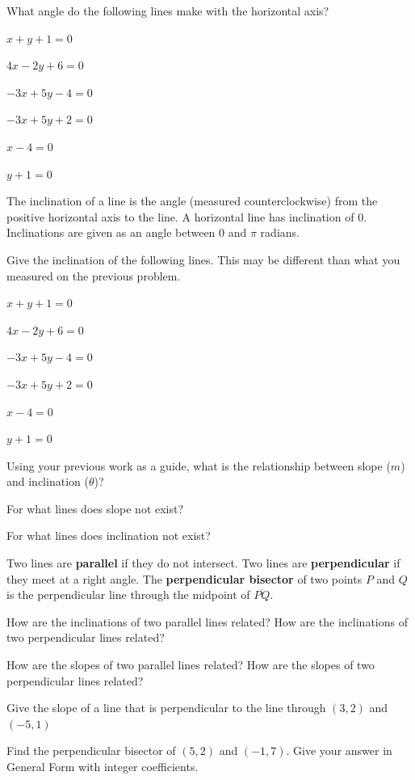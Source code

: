 \bq What angle do the following lines make with the horizontal axis?
\be
\item $x+y+1=0$
\item $4x-2y+6=0$
\item $-3x+5y-4=0$
\item $-3x+5y+2=0$
\item $x-4=0$
\item $y+1=0$
\ee
\eq

\begin{info} The inclination of a line is the angle (measured counterclockwise) from the positive horizontal axis to the line. A horizontal line has inclination of $0$. Inclinations are given as an angle between $0$ and $\pi$ radians. \end{info}

\bq Give the inclination of the following lines. This may be different than what you measured on the previous problem.
\be
\item $x+y+1=0$
\item $4x-2y+6=0$
\item $-3x+5y-4=0$
\item $-3x+5y+2=0$
\item $x-4=0$
\item $y+1=0$
\ee
\eq

\bq Using your previous work as a guide, what is the relationship between slope ($m$) and inclination ($\theta$)?
\eq
\bq \be \item For what lines does slope not exist?
\item For what lines does inclination not exist?
\ee
\eq

\begin{info} Two lines are \textbf{parallel} if they do not intersect. Two lines are \textbf{perpendicular} if they meet at a right angle. The \textbf{perpendicular bisector} of two points $P$ and $Q$ is the perpendicular line through the midpoint of $\overline{PQ}$.
\end{info}

\bq How are the inclinations of two parallel lines related? How are the inclinations of two perpendicular lines related?
\eq

\bq How are the slopes of two parallel lines related? How are the slopes of two perpendicular lines related?
\eq

\bq Give the slope of a line that is perpendicular to the line through $(3,2)$ and $(-5,1)$
\eq

\bq Find the perpendicular bisector of $(5,2)$ and $(-1,7)$. Give your answer in General Form with integer coefficients.
\eq

